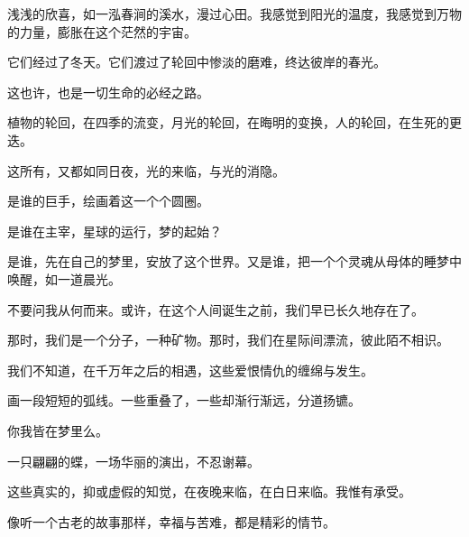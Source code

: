 \documentclass[12pt,a4paper]{article}
\begin{document}
		浅浅的欣喜，如一泓春涧的溪水，漫过心田。我感觉到阳光的温度，我感觉到万物的力量，膨胀在这个茫然的宇宙。\par
		它们经过了冬天。它们渡过了轮回中惨淡的磨难，终达彼岸的春光。\par
		这也许，也是一切生命的必经之路。\par
		植物的轮回，在四季的流变，月光的轮回，在晦明的变换，人的轮回，在生死的更迭。\par
		这所有，又都如同日夜，光的来临，与光的消隐。\par
		是谁的巨手，绘画着这一个个圆圈。\par
		是谁在主宰，星球的运行，梦的起始？\par
		是谁，先在自己的梦里，安放了这个世界。又是谁，把一个个灵魂从母体的睡梦中唤醒，如一道晨光。\par
		不要问我从何而来。或许，在这个人间诞生之前，我们早已长久地存在了。\par
		那时，我们是一个分子，一种矿物。那时，我们在星际间漂流，彼此陌不相识。\par
		我们不知道，在千万年之后的相遇，这些爱恨情仇的缠绵与发生。\par
		画一段短短的弧线。一些重叠了，一些却渐行渐远，分道扬镳。\par
		你我皆在梦里么。\par
		一只翩翩的蝶，一场华丽的演出，不忍谢幕。\par
		这些真实的，抑或虚假的知觉，在夜晚来临，在白日来临。我惟有承受。\par
		像听一个古老的故事那样，幸福与苦难，都是精彩的情节。

	\endwriting


\end{document}
